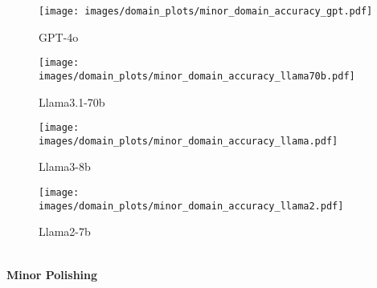 \begin{figure*}[htbp]
    \vspace{0.5cm} %
    \begin{minipage}{\textwidth}
    \centering
        \begin{subfigure}{0.24\textwidth}
            \centering
            \texttt{[image: images/domain\_plots/minor\_domain\_accuracy\_gpt.pdf]}
            \caption{GPT-4o}
        \end{subfigure}
        \hfill
        \begin{subfigure}{0.24\textwidth}
            \centering
            \texttt{[image: images/domain\_plots/minor\_domain\_accuracy\_llama70b.pdf]}
            \caption{Llama3.1-70b}
        \end{subfigure}
        \hfill
        \begin{subfigure}{0.24\textwidth}
            \centering
            \texttt{[image: images/domain\_plots/minor\_domain\_accuracy\_llama.pdf]}
            \caption{Llama3-8b}
        \end{subfigure}
        \hfill
        \begin{subfigure}{0.24\textwidth}
            \centering
            \texttt{[image: images/domain\_plots/minor\_domain\_accuracy\_llama2.pdf]}
            \caption{Llama2-7b}
        \end{subfigure}
        \\ %
        \vspace{0.2cm}
        \small \textbf{Minor Polishing}
    \end{minipage}


\end{figure*}
